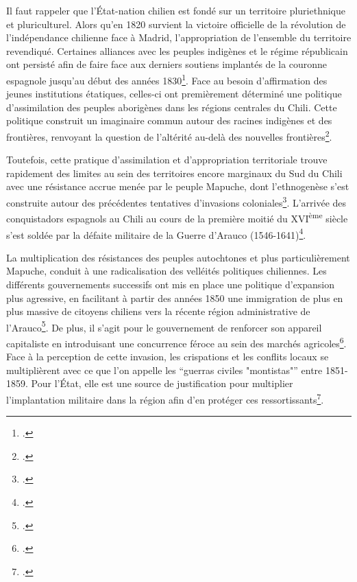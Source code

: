 	Il faut rappeler que l'État-nation chilien est fondé sur un territoire pluriethnique et pluriculturel. Alors qu'en 1820 survient la victoire officielle de la révolution de l'indépendance chilienne face à Madrid, l'appropriation de l'ensemble du territoire revendiqué. Certaines alliances avec les peuples indigènes et le régime républicain ont persisté afin de faire face aux derniers soutiens implantés de la couronne espagnole jusqu'au début des années 1830\footcite{quemenadoGeoestrategiaConflictoChileno2017a}. Face au besoin d'affirmation des jeunes institutions étatiques, celles-ci ont premièrement déterminé une politique d'assimilation des peuples aborigènes dans les régions centrales du Chili. Cette politique construit un imaginaire commun autour des racines indigènes et des frontières, renvoyant la question de l'altérité au-delà des nouvelles frontières\footcite[p~.19-21]{bengoaMemoriaOlvidadaHistoria2004}.
	
	Toutefois, cette pratique d'assimilation et d'appropriation territoriale trouve rapidement des limites au sein des territoires encore marginaux du Sud du Chili avec une résistance accrue menée par le peuple Mapuche, dont l'ethnogenèse s'est construite autour des précédentes tentatives d'invasions coloniales\footcite{boccaraOrganisationSocialeGuerre1999a}. L’arrivée des conquistadors espagnols au Chili au cours de la première moitié du XVI\textsuperscript{ème} siècle s'est soldée par la défaite militaire de la Guerre d’Arauco (1546-1641)\footcite{sepulvedaPaysMapucheTerritoire2012}.
	
	La multiplication des résistances des peuples autochtones et plus particulièrement Mapuche, conduit à une radicalisation des velléités politiques chiliennes. Les différents gouvernements successifs ont mis en place une politique d'expansion plus agressive, en facilitant à partir des années 1850 une immigration de plus en plus massive de citoyens chiliens vers la récente région administrative de l'Arauco\footcite[p.331-332]{bengoaMemoriaOlvidadaHistoria2004}. De plus, il s'agit pour le gouvernement de renforcer son appareil capitaliste en introduisant une concurrence féroce au sein des marchés agricoles\footcite{sepulvedaPaysMapucheTerritoire2012}. Face à la perception de cette invasion, les crispations et les conflits locaux se multiplièrent avec ce que l'on appelle les \enquote{guerras civiles "montistas"} entre 1851-1859. Pour l'État, elle est une source de justification pour multiplier l'implantation militaire dans la région afin d'en protéger ces ressortissants\footcite[p~.313]{bengoaMemoriaOlvidadaHistoria2004}.
	
